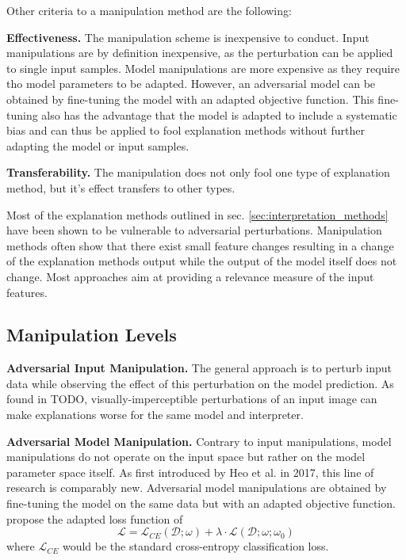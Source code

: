 Other criteria to a manipulation method are the following:

\noindent\textbf{Effectiveness.} The manipulation scheme is inexpensive to conduct. Input manipulations are by definition inexpensive, as the perturbation can be applied to single input samples. Model manipulations are more expensive as they require tho model parameters to be adapted. However, an adversarial model can be obtained by fine-tuning the model with an adapted objective function. This fine-tuning also has the advantage that the model is adapted to include a systematic bias and can thus be applied to fool explanation methods without further adapting the model or input samples.

\noindent\textbf{Transferability.} The manipulation does not only fool one type of explanation method, but it's effect transfers to other types. 



Most of the explanation methods outlined in sec. \autoref{sec:interpretation_methods} have been shown to be vulnerable to adversarial perturbations. 
Manipulation methods often show that there exist small feature changes resulting in a change of the explanation methods output while the output of the model itself does not change. 
Most approaches aim at providing a relevance measure of the input features. \\



\subsection{Manipulation Levels}
\label{subsec:manipulation_levels}

\noindent\textbf{Adversarial Input Manipulation.} The general approach is to perturb input data while observing the effect of this perturbation on the model prediction. As found in TODO, visually-imperceptible perturbations of an input image can make explanations worse for the same model and interpreter. 


\noindent\textbf{Adversarial Model Manipulation.} 
Contrary to input manipulations, model manipulations do not operate on the input space but rather on the model parameter space itself. 
As first introduced by Heo et al. \cite{fooling_nn_interpreters} in 2017, this line of research is comparably new. 
Adversarial model manipulations are obtained by fine-tuning the model on the same data but with an adapted objective function. \cite{fooling_nn_interpreters} propose the adapted loss function of $$ \mathcal{L} = \mathcal{L}_{CE}(\mathcal{D};\omega) + \lambda \cdot \mathcal{L}(\mathcal{D};\omega; \omega_0) $$ where $\mathcal{L}_{CE}$ would be the standard cross-entropy classification loss. 

